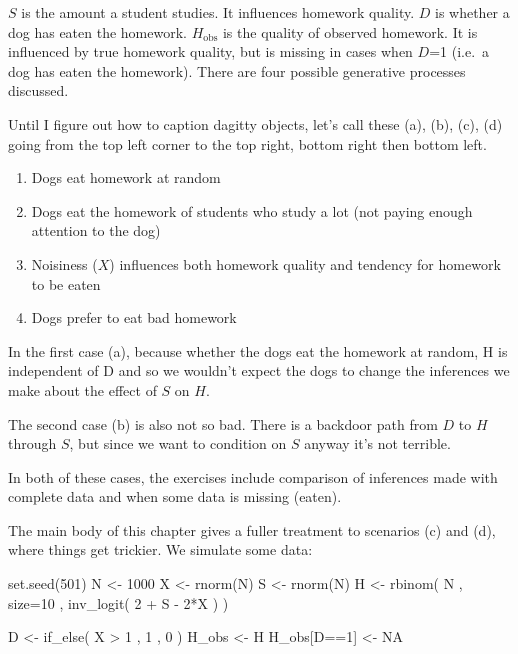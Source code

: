 \documentclass[
]{book}
\newenvironment{Shaded}{\begin{snugshade}}{\end{snugshade}}
\newcommand{\AttributeTok}[1]{\textcolor[rgb]{0.77,0.63,0.00}{#1}}
\newcommand{\ConstantTok}[1]{\textcolor[rgb]{0.00,0.00,0.00}{#1}}
\newcommand{\DecValTok}[1]{\textcolor[rgb]{0.00,0.00,0.81}{#1}}
\newcommand{\FunctionTok}[1]{\textcolor[rgb]{0.00,0.00,0.00}{#1}}
\newcommand{\NormalTok}[1]{#1}
\newcommand{\OtherTok}[1]{\textcolor[rgb]{0.56,0.35,0.01}{#1}}
\newcommand{\SpecialCharTok}[1]{\textcolor[rgb]{0.00,0.00,0.00}{#1}}
\providecommand{\tightlist}{%
  \setlength{\itemsep}{0pt}\setlength{\parskip}{0pt}}
\begin{document}
\(S\) is the amount a student studies. It influences homework quality. \(D\) is whether a dog has eaten the homework. \(H_\text{obs}\) is the quality of observed homework. It is influenced by true homework quality, but is missing in cases when \(D\)=1 (i.e.~a dog has eaten the homework). There are four possible generative processes discussed.

Until I figure out how to caption dagitty objects, let's call these (a), (b), (c), (d) going from the top left corner to the top right, bottom right then bottom left.

\begin{enumerate}
\def\labelenumi{(\alph{enumi})}
\tightlist
\item
  Dogs eat homework at random
\item
  Dogs eat the homework of students who study a lot (not paying enough attention to the dog)
\item
  Noisiness (\(X\)) influences both homework quality and tendency for homework to be eaten
\item
  Dogs prefer to eat bad homework
\end{enumerate}

In the first case (a), because whether the dogs eat the homework at random, H is independent of D and so we wouldn't expect the dogs to change the inferences we make about the effect of \(S\) on \(H\).

The second case (b) is also not so bad. There is a backdoor path from \(D\) to \(H\) through \(S\), but since we want to condition on \(S\) anyway it's not terrible.

In both of these cases, the exercises include comparison of inferences made with complete data and when some data is missing (eaten).

The main body of this chapter gives a fuller treatment to scenarios (c) and (d), where things get trickier. We simulate some data:

\begin{Shaded}
\begin{Highlighting}[]
\FunctionTok{set.seed}\NormalTok{(}\DecValTok{501}\NormalTok{) }
\NormalTok{N }\OtherTok{\textless{}{-}} \DecValTok{1000} 
\NormalTok{X }\OtherTok{\textless{}{-}} \FunctionTok{rnorm}\NormalTok{(N) }
\NormalTok{S }\OtherTok{\textless{}{-}} \FunctionTok{rnorm}\NormalTok{(N)}
\NormalTok{H }\OtherTok{\textless{}{-}} \FunctionTok{rbinom}\NormalTok{( N , }\AttributeTok{size=}\DecValTok{10}\NormalTok{ , }\FunctionTok{inv\_logit}\NormalTok{( }\DecValTok{2} \SpecialCharTok{+}\NormalTok{ S }\SpecialCharTok{{-}} \DecValTok{2}\SpecialCharTok{*}\NormalTok{X ) )}

\NormalTok{D }\OtherTok{\textless{}{-}} \FunctionTok{if\_else}\NormalTok{( X }\SpecialCharTok{\textgreater{}} \DecValTok{1}\NormalTok{ , }\DecValTok{1}\NormalTok{ , }\DecValTok{0}\NormalTok{ ) }
\NormalTok{H\_obs }\OtherTok{\textless{}{-}}\NormalTok{ H}
\NormalTok{H\_obs[D}\SpecialCharTok{==}\DecValTok{1}\NormalTok{] }\OtherTok{\textless{}{-}} \ConstantTok{NA}
\end{Highlighting}
\end{Shaded}
\end{document}
